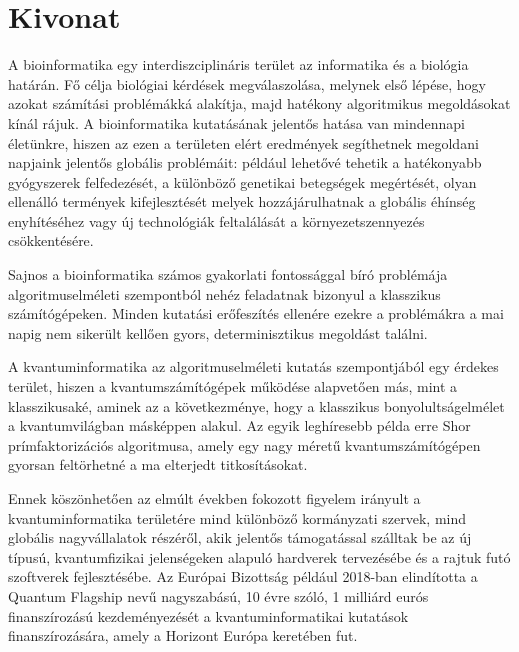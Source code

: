 \setcounter{page}{1}

\selecthungarian

\chapter*{Kivonat}

A bioinformatika egy interdiszciplináris terület az informatika és a biológia határán. Fő célja biológiai kérdések megválaszolása, melynek első lépése, hogy azokat számítási problémákká alakítja, majd hatékony algoritmikus megoldásokat kínál rájuk. A bioinformatika kutatásának jelentős hatása van mindennapi életünkre, hiszen az ezen a területen elért eredmények segíthetnek megoldani napjaink jelentős globális problémáit: például lehetővé tehetik a hatékonyabb gyógyszerek felfedezését, a különböző genetikai betegségek megértését, olyan ellenálló termények kifejlesztését melyek hozzájárulhatnak a globális éhínség enyhítéséhez vagy új technológiák feltalálását a környezetszennyezés csökkentésére.

Sajnos a bioinformatika számos gyakorlati fontossággal bíró problémája algoritmuselméleti szempontból nehéz feladatnak bizonyul a klasszikus számítógépeken. Minden kutatási erőfeszítés ellenére ezekre a problémákra a mai napig nem sikerült kellően gyors, determinisztikus megoldást találni.

A kvantuminformatika az algoritmuselméleti kutatás szempontjából egy érdekes terület, hiszen a kvantumszámítógépek működése alapvetően más, mint a klasszikusaké, aminek az a következménye, hogy a klasszikus bonyolultságelmélet a kvantumvilágban másképpen alakul. Az egyik leghíresebb példa erre Shor prímfaktorizációs algoritmusa, amely egy nagy méretű kvantumszámítógépen gyorsan feltörhetné a ma elterjedt titkosításokat.

Ennek köszönhetően az elmúlt években fokozott figyelem irányult a kvantuminformatika területére mind különböző kormányzati szervek, mind globális nagyvállalatok részéről, akik jelentős támogatással szálltak be az új típusú, kvantumfizikai jelenségeken alapuló hardverek tervezésébe és a rajtuk futó szoftverek fejlesztésébe. Az Európai Bizottság például 2018-ban elindította a Quantum Flagship nevű nagyszabású, 10 évre szóló, 1 milliárd eurós finanszírozású kezdeményezését a kvantuminformatikai kutatások finanszírozására, amely a Horizont Európa keretében fut.

